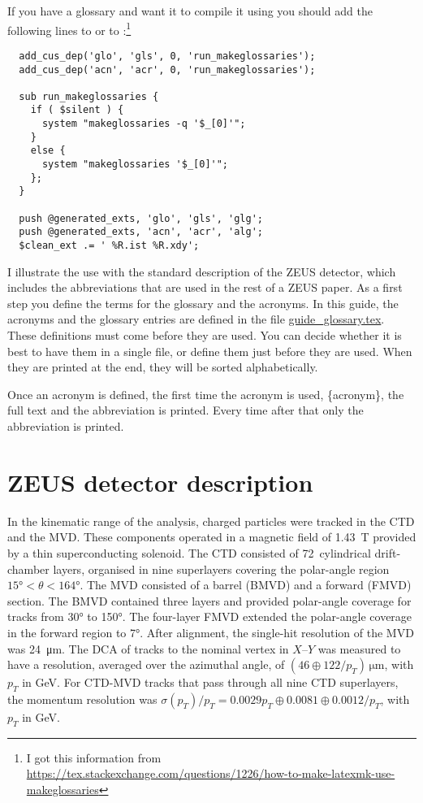 If you have a glossary and want it to compile it using 
you should add the following
lines to  or to :\footnote{%
I got this information from \url{https://tex.stackexchange.com/questions/1226/how-to-make-latexmk-use-makeglossaries}}
\begin{verbatim}
  add_cus_dep('glo', 'gls', 0, 'run_makeglossaries');
  add_cus_dep('acn', 'acr', 0, 'run_makeglossaries');
  
  sub run_makeglossaries {
    if ( $silent ) {
      system "makeglossaries -q '$_[0]'";
    }
    else {
      system "makeglossaries '$_[0]'";
    };
  }
  
  push @generated_exts, 'glo', 'gls', 'glg';
  push @generated_exts, 'acn', 'acr', 'alg';
  $clean_ext .= ' %R.ist %R.xdy';
\end{verbatim}

I illustrate the use with the standard description of the ZEUS
detector, which includes the abbreviations that are used in the rest
of a ZEUS paper.  As a first step you define the terms for the
glossary and the acronyms.  In this guide, the acronyms and the
glossary entries are defined in the file
\url{guide_glossary.tex}. These definitions must come before
they are used. You can decide whether it is best to have them in a
single file, or define them just before they are used. When they are
printed at the end, they will be sorted alphabetically.

Once an acronym is defined, the first time the acronym is used,
\{acronym\}, the full text and the abbreviation is
printed. Every time after that only the abbreviation is printed.

\section{ZEUS detector description}%
\label{sec:app:glossary:zeus}

In the kinematic range of the analysis, charged particles were tracked
in the \gls{CTD} and the
\gls{MVD}. These components operated in a magnetic
field of \SI{1.43}{\tesla} provided by a thin superconducting solenoid. The
\gls{CTD} consisted of 72~cylindrical drift-chamber layers, organised in nine
superlayers covering the polar-angle region
$\ang{15} < \theta < \ang{164}$.
%
The \gls{MVD} consisted of a barrel (BMVD) and a forward (FMVD)
section. The BMVD contained three layers and provided polar-angle
coverage for tracks from \ang{30} to \ang{150}. The four-layer FMVD
extended the polar-angle coverage in the forward region to
\ang{7}. After alignment, the single-hit resolution of the MVD was
\SI{24}{\micro\metre}. The \gls{DCA} of tracks to the nominal vertex in
$X$--$Y$ was measured to have a resolution, averaged over the
azimuthal angle, of $(46 \oplus 122 /
  p_{T})\,\si{\micro\metre}$, with $p_{T}$ in \si{\GeV}.  For \gls{CTD}-\gls{MVD} tracks
that pass through all nine \gls{CTD} superlayers, the momentum
resolution was $\sigma(p_{T})/p_{T} = 0.0029 p_{T} \oplus 0.0081
\oplus 0.0012/p_{T}$, with $p_{T}$ in \si{\GeV}.

